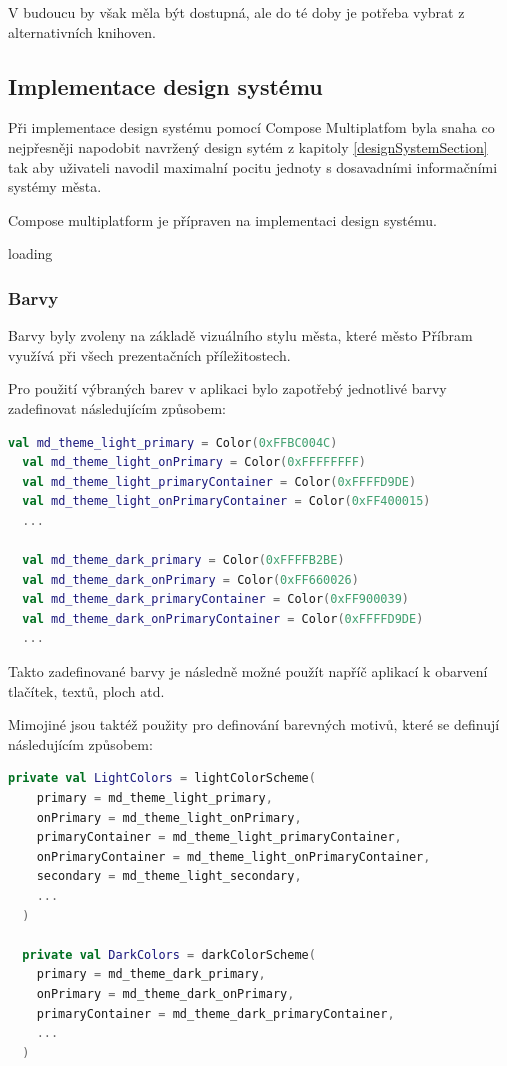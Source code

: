 V budoucu by však měla být dostupná, ale do té doby je potřeba vybrat z alternativních knihoven.



\subsection{Implementace design systému}

Při implementace design systému pomocí Compose Multiplatfom byla snaha co nejpřesněji napodobit navržený design sytém z kapitoly \ref{designSystemSection}
tak aby uživateli navodil maximalní pocitu jednoty s dosavadními informačními systémy města.


Compose multiplatform je přípraven na implementaci design systému. 

loading


\subsubsection{Barvy}
Barvy byly zvoleny na základě vizuálního stylu města, které město Příbram využívá při všech prezentačních příležitostech.

Pro použití výbraných barev v aplikaci bylo zapotřebý jednotlivé barvy zadefinovat následujícím způsobem:

\begin{lstlisting}[caption={Zadefinování barev}, label={lst:ComposeCode}, language=Kotlin]
  val md_theme_light_primary = Color(0xFFBC004C)
  val md_theme_light_onPrimary = Color(0xFFFFFFFF)
  val md_theme_light_primaryContainer = Color(0xFFFFD9DE)
  val md_theme_light_onPrimaryContainer = Color(0xFF400015)
  ...

  val md_theme_dark_primary = Color(0xFFFFB2BE)
  val md_theme_dark_onPrimary = Color(0xFF660026)
  val md_theme_dark_primaryContainer = Color(0xFF900039)
  val md_theme_dark_onPrimaryContainer = Color(0xFFFFD9DE)
  ...
\end{lstlisting}

Takto zadefinované barvy je následně možné použít napříč aplikací k obarvení tlačítek, textů, ploch atd.

Mimojiné jsou taktéž použity pro definování barevných motivů, které se definují následujícím způsobem:

\begin{lstlisting}[caption={Definice barevných motivů}, label={lst:ComposeCode}, language=Kotlin]
  private val LightColors = lightColorScheme(
    primary = md_theme_light_primary,
    onPrimary = md_theme_light_onPrimary,
    primaryContainer = md_theme_light_primaryContainer,
    onPrimaryContainer = md_theme_light_onPrimaryContainer,
    secondary = md_theme_light_secondary,
    ...
  )

  private val DarkColors = darkColorScheme(
    primary = md_theme_dark_primary,
    onPrimary = md_theme_dark_onPrimary,
    primaryContainer = md_theme_dark_primaryContainer,
    ...
  )
\end{lstlisting}

